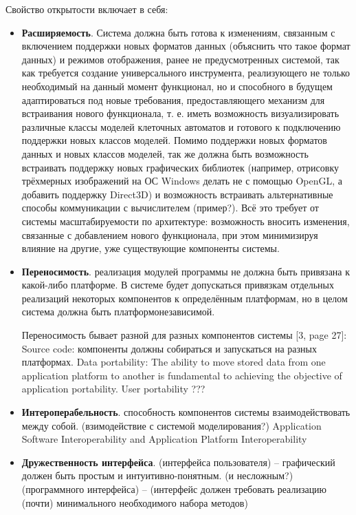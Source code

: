 \documentclass[a4paper,12pt]{extarticle}
\begin{document}
Свойство открытости включает в себя:
\begin{itemize}
    \item \textbf{Расширяемость}.
        Система должна быть готова к изменениям, связанным с включением поддержки новых форматов данных (объяснить что такое формат данных) и режимов отображения, ранее не предусмотренных системой, так как требуется создание универсального инструмента, реализующего не только необходимый на данный момент функционал, но и способного в будущем адаптироваться под новые требования, предоставляющего механизм для встраивания нового функционала, т. е. иметь возможность визуализировать различные классы моделей клеточных автоматов и готового к подключению поддержки новых классов моделей. Помимо поддержки новых форматов данных и новых классов моделей, так же должна быть возможность встраивать поддержку новых графических библиотек (например, отрисовку трёхмерных изображений на ОС Windows делать не с помощью OpenGL, а добавить поддержку Direct3D) и возможность встраивать альтернативные способы коммуникации с вычислителем (пример?).
        Всё это требует от системы масштабируемости по архитектуре: возможность вносить изменения, связанные с добавлением нового функционала, при этом минимизируя влияние на другие, уже существующие компоненты системы.
        
   \item \textbf{Переносимость}.
        реализация модулей программы не должна быть привязана к какой-либо платформе. В системе будет допускаться привязкам отдельных реализаций некоторых компонентов к определённым платформам, но в целом система должна быть платформонезависимой.
        
        Переносимость бывает разной для разных компонентов системы [3, page 27]:
        Source code: компоненты должны собираться и запускаться на разных платформах.
        Data portability: The ability to move stored data from one application platform to another is fundamental to achieving the objective of application portability. 
        User portability ???
        
    \item \textbf{Интероперабельность}.
        способность компонентов системы взаимодействовать между собой. (взимодействие с системой моделирования?)
        Application Software Interoperability and Application Platform Interoperability
        
    \item \textbf{Дружественность интерфейса}.
        (интерфейса пользователя) – графический должен быть простым и интуитивно-понятным. (и несложным?)
        (программного интерфейса) –  (интерфейс должен требовать реализацию (почти) минимального необходимого набора методов)
\end{itemize}
\end{document}
